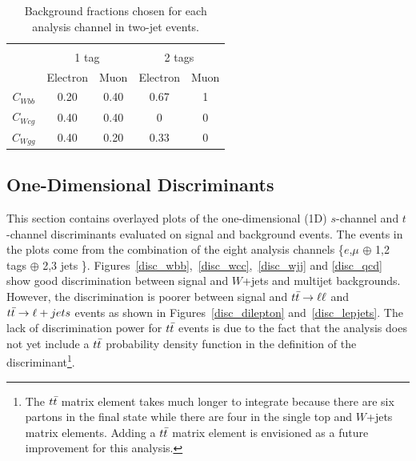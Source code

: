 \begin{table}[!h!tbp]
\begin{center}
\caption{Background fractions chosen for each analysis channel
in two-jet events.}
\label{frac}
\begin{tabular}{c|cccc}
\vspace{0.1in} \\
           & \multicolumn{2}{c}{1 tag} & \multicolumn{2}{c}{2 tags}\\
           & Electron &   Muon   & Electron &   Muon   \\
\hline
$C_{Wbb}$  &   0.20   &   0.40   &   0.67   &     1    \\
$C_{Wcg}$  &   0.40   &   0.40   &     0    &     0    \\
$C_{Wgg}$  &   0.40   &   0.20   &   0.33   &     0
\end{tabular}
\vspace{-0.1 in}
\end{center}
\end{table}

 
\subsection{One-Dimensional Discriminants}

This section contains overlayed plots of the one-dimensional (1D) $s$-channel and $t$-channel discriminants evaluated on signal and background events. The events in the plots come from the combination of the eight analysis channels \{$e$,$\mu$ $\oplus$ 1,2 tags $\oplus$ 2,3 jets \}. Figures~\ref{disc_wbb},~\ref{disc_wcc},~\ref{disc_wjj} and \ref{disc_qcd} show good discrimination between signal and $W$+jets and multijet backgrounds. However, the discrimination is poorer between signal and $\mbox{$t\bar{t}$} \rightarrow \ell \ell$ and $\mbox{$t\bar{t}$} \rightarrow \ell + jets$ events as shown in Figures~\ref{disc_dilepton} and~\ref{disc_lepjets}. The lack of discrimination power for $\mbox{$t\bar{t}$}$ events is due to the fact that the analysis does not yet include a $\mbox{$t\bar{t}$}$ probability density function in the definition of the discriminant\footnote{The $\mbox{$t\bar{t}$}$ matrix element takes much longer to integrate because there are six partons in the final state while there are four in the single top and $W$+jets matrix elements. Adding a $\mbox{$t\bar{t}$}$ matrix element is envisioned as a future improvement for this analysis.}.

